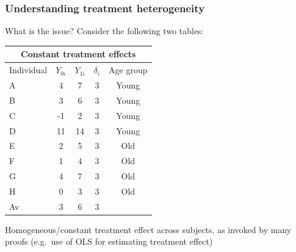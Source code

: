 \documentclass[12pt,english,dvipsnames,aspectratio=169,handout]{beamer}\usepackage[]{graphicx}\usepackage[]{xcolor}
\begin{document}
\begin{frame}
  \frametitle{Understanding treatment heterogeneity}
\footnotesize
What is the issue? Consider the following two tables:

\tiny
\begin{table}\centering
\begin{tabular}{lcccc}
\toprule
\multicolumn{5}{c}{Constant treatment effects}   \\
\midrule
Individual & $Y_{0i}$ &  $Y_{1i}$  & $\delta_i$ & Age group   \\
\midrule
A          &   4    &    7     &   3      & Young        \\
B          &   3    &    6     &   3      & Young        \\
C          &   -1    &    2     &   3      & Young        \\
D          &   11    &    14     &   3      & Young        \\
E          &   2    &    5     &   3      & Old        \\
F          &   1    &    4     &   3      & Old        \\
G          &   4    &    7     &   3      & Old        \\
H          &   0    &    3     &   3      & Old        \\
\hline\hline
Av         &   3    &    6     &   3      &         \\
\bottomrule
\end{tabular}
\end{table}

\footnotesize
Homogeneous/constant treatment effect across subjects, as invoked by many proofs (e.g.\ use of OLS for estimating treatment effect)

\end{frame}
\end{document}
